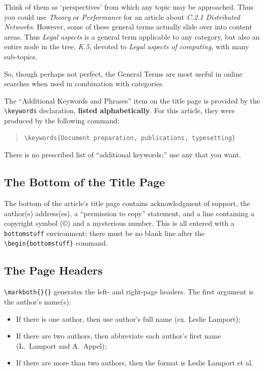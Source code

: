 \documentclass[acmtocl]{acmtrans2m}
\begin{document}
Think of them as `perspectives' from which any topic may
be approached. Thus you could use {\em Theory} or {\em Performance} 
for an
article about {\em C.2.1 Distributed Networks}. However, 
some of these general terms actually slide over into
content areas. Thus {\em Legal aspects} is a general term
applicable to any category, but also an entire node in the tree,
{\em K.5}, devoted to {\em Legal aspects of computing,} with many 
sub-topics.

So, though perhaps not perfect, the General Terms are most useful
in online searches when used in combination with categories.

The ``Additional Keywords and Phrases'' item on the title page
is provided by the \verb|\keywords| declaration, {\bf listed 
alphabetically\/}.
For this article,  
they were produced by the following command:
\begin{quote}
\begin{verbatim}
\keywords{Document preparation, publications, typesetting}
\end{verbatim}
\end{quote}
There is no prescribed list of ``additional keywords;'' use any that
you want.

\subsection{The Bottom of the Title Page}\label{sec:permission}

The bottom of the article's title page contains acknowledgment of
support, the author(s) address(es), a ``permission to copy'' 
statement,
and a line containing a copyright symbol (\copyright) and a mysterious
number.  This is all entered with a {\tt bottomstuff} environment;
there must be no blank line after the \verb|\begin{bottomstuff}|
command.  

\subsection{The Page Headers}

\verb|\markboth{}{}| generates the left- and right-page headers. The 
first 
argument is the author's name(s):

\begin{itemize}
\item If there is one author, then use author's full name (ex. Leslie 
Lamport);
\item If there are two authors, then abbreviate each author's first 
name
           (L.~Lamport and A.~Appel);
\item If there are more than two authors, then the format is Leslie 
Lamport et al.
\end{itemize}
\end{document}
